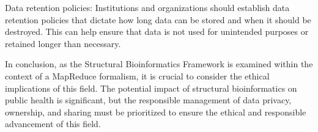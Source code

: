 \documentclass[]{final_report}
\begin{document}
Data retention policies: Institutions and organizations should establish data retention policies that dictate how long data can be stored and when it should be destroyed. This can help ensure that data is not used for unintended purposes or retained longer than necessary.

In conclusion, as the Structural Bioinformatics Framework is examined within the context of a MapReduce formalism, it is crucial to consider the ethical implications of this field. The potential impact of structural bioinformatics on public health is significant, but the responsible management of data privacy, ownership, and sharing must be prioritized to ensure the ethical and responsible advancement of this field.





\end{document}
